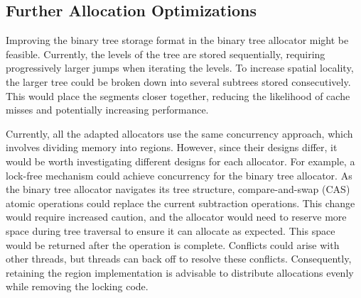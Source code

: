 \subsection{Further Allocation Optimizations} \label{sec:futureworkOptimizations}
Improving the binary tree storage format in the binary tree allocator might be feasible. Currently, the levels of the tree are stored sequentially, requiring progressively larger jumps when iterating the levels. To increase spatial locality, the larger tree could be broken down into several subtrees stored consecutively. This would place the segments closer together, reducing the likelihood of cache misses and potentially increasing performance.

Currently, all the adapted allocators use the same concurrency approach, which involves dividing memory into regions. However, since their designs differ, it would be worth investigating different designs for each allocator. For example, a lock-free mechanism could achieve concurrency for the binary tree allocator. As the binary tree allocator navigates its tree structure, compare-and-swap (CAS) atomic operations could replace the current subtraction operations. This change would require increased caution, and the allocator would need to reserve more space during tree traversal to ensure it can allocate as expected. This space would be returned after the operation is complete. Conflicts could arise with other threads, but threads can back off to resolve these conflicts. Consequently, retaining the region implementation is advisable to distribute allocations evenly while removing the locking code.

% 

